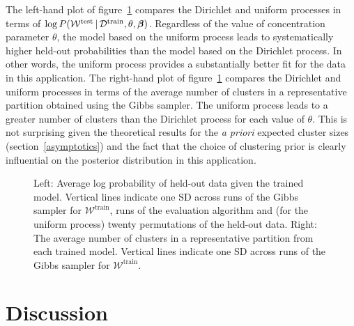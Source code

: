 \documentclass[twoside]{article}
\begin{document}
The left-hand plot of figure~\ref{resultsfig} compares the Dirichlet
and uniform processes in terms of $\log{P(\mathcal{W}^{\textrm{test}}
  \,|\,\mathcal{D}^{\textrm{train}}, \theta, \boldsymbol{\beta})}$. Regardless of
the value of concentration parameter $\theta$, the model based on the
uniform process leads to systematically higher held-out probabilities
than the model based on the Dirichlet process. In other words, the
uniform process provides a substantially better fit for the data in
this application.  The right-hand plot of figure~\ref{resultsfig}
compares the Dirichlet and uniform processes in terms of the average
number of clusters in a representative partition obtained using the
Gibbs sampler. The uniform process leads to a greater number of
clusters than the Dirichlet process for each value of $\theta$.  This
is not surprising given the theoretical results for the {\it a priori}
expected cluster sizes (section~\ref{asymptotics}) and the fact that
the choice of clustering prior is clearly influential on the posterior
distribution in this application.
\begin{figure}[t]
\vspace{-0.25cm}
\centering
{}
\caption{Left: Average log probability of held-out data given the
  trained model. Vertical lines indicate one SD across runs of the
  Gibbs sampler for $\mathcal{W}^{\textrm{train}}$, runs of the
  evaluation algorithm and (for the uniform process) twenty
  permutations of the held-out data. Right: The average number of
  clusters in a representative partition from each trained
  model. Vertical lines indicate one SD across runs of the Gibbs
  sampler for $\mathcal{W}^{\textrm{train}}$.}\label{resultsfig}
\vspace{-0.4cm}
\end{figure}

\section{Discussion}\label{discussion}
\end{document}

